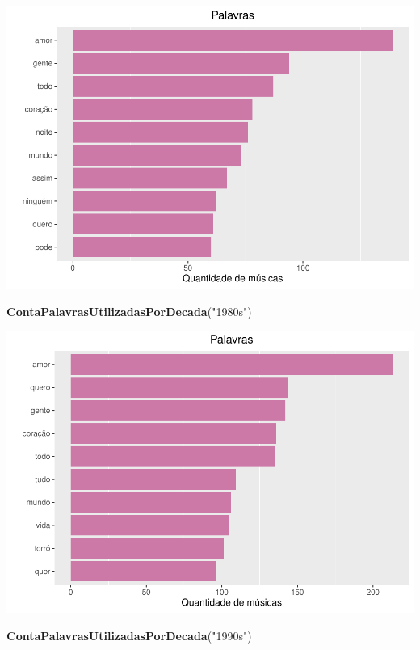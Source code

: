 \documentclass[]{article}
\newenvironment{Shaded}{\begin{snugshade}}{\end{snugshade}}
\newcommand{\KeywordTok}[1]{\textcolor[rgb]{0.13,0.29,0.53}{\textbf{#1}}}
\newcommand{\NormalTok}[1]{#1}
\newcommand{\StringTok}[1]{\textcolor[rgb]{0.31,0.60,0.02}{#1}}
\begin{document}
\includegraphics{avaliacaoLetrasDeForro_files/figure-latex/unnamed-chunk-5-3.pdf}

\begin{Shaded}
\begin{Highlighting}[]
\KeywordTok{ContaPalavrasUtilizadasPorDecada}\NormalTok{(}\StringTok{"1980s"}\NormalTok{)}
\end{Highlighting}
\end{Shaded}

\includegraphics{avaliacaoLetrasDeForro_files/figure-latex/unnamed-chunk-5-4.pdf}

\begin{Shaded}
\begin{Highlighting}[]
\KeywordTok{ContaPalavrasUtilizadasPorDecada}\NormalTok{(}\StringTok{"1990s"}\NormalTok{)}
\end{Highlighting}
\end{Shaded}
\end{document}
